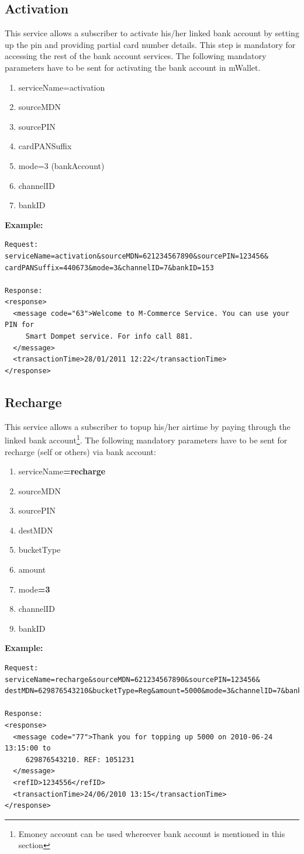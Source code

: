 \documentclass[11pt,titlepage]{article}
\begin{document}
\subsection{Activation}
This service allows a subscriber to activate his/her linked bank account by setting up the pin and providing partial card number details. This step is mandatory for accessing the rest of the bank account services.
The following mandatory parameters have to be sent for activating the bank 
account in mWallet.
\begin{enumerate}
\item serviceName=activation
\item sourceMDN
\item sourcePIN
\item cardPANSuffix
\item mode=3 (bankAccount)
\item channelID
\item bankID
\end{enumerate}
\textbf{Example:}
\begin{verbatim}
Request:
serviceName=activation&sourceMDN=621234567890&sourcePIN=123456&
cardPANSuffix=440673&mode=3&channelID=7&bankID=153

Response:
<response>
  <message code="63">Welcome to M-Commerce Service. You can use your PIN for 
     Smart Dompet service. For info call 881.
  </message>
  <transactionTime>28/01/2011 12:22</transactionTime>
</response>
\end{verbatim}

\subsection{Recharge}
This service allows a subscriber to topup his/her airtime by paying through the linked bank account\footnote{Emoney account can be used whereever bank account is mentioned in this section}. 
The following mandatory parameters have to be sent for recharge (self or 
others) via bank account:
\begin{enumerate}
\item serviceName\textbf{=recharge}
\item sourceMDN
\item sourcePIN
\item destMDN
\item bucketType
\item amount
\item mode\textbf{=3}
\item channelID
\item bankID
\end{enumerate}
\textbf{Example:}
\begin{verbatim}
Request:
serviceName=recharge&sourceMDN=621234567890&sourcePIN=123456&
destMDN=629876543210&bucketType=Reg&amount=5000&mode=3&channelID=7&bankID=153

Response:
<response>
  <message code="77">Thank you for topping up 5000 on 2010-06-24 13:15:00 to 
     629876543210. REF: 1051231
  </message>
  <refID>1234556</refID>
  <transactionTime>24/06/2010 13:15</transactionTime>
</response>
\end{verbatim}
\end{document}
